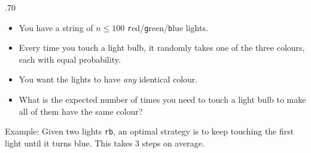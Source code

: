 \begin{frame}
    \frametitle{\problemtitle}

    \begin{columns}
        \begin{column}[T]{.70\textwidth}
            \begin{itemize}
                \item You have a string of $n \leq 100$ \texttt{r}ed/\texttt{g}reen/\texttt{b}lue lights.
                \item Every time you touch a light bulb, it randomly takes one of the three colours,
                    each with equal probability.
                \item You want the lights to have \emph{any} identical colour.
                \item What is the expected number of times you need to touch a light bulb
                    to make all of them have the same colour?
            \end{itemize}

            \vspace{1em}
            Example: Given two lights \texttt{rb}, an optimal strategy is to keep touching the first light until it turns blue. This takes $3$ steps on average.


        \end{column}

    \end{columns}
\end{frame}
